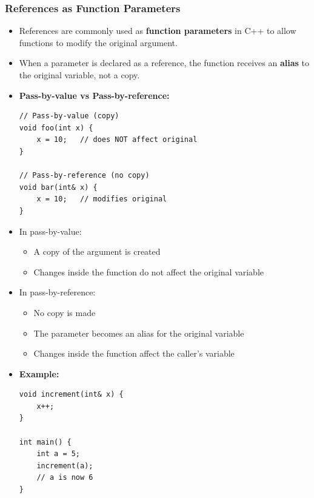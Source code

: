 \documentclass[10pt]{article}
\newcommand{\pbreak}{\vspace{30pt}}
\begin{document}
\newpage

\subsubsection{References as Function Parameters}

\begin{itemize}
    \item References are commonly used as \textbf{function parameters} in C++ to allow functions to modify the original argument.

    \item When a parameter is declared as a reference, the function receives an \textbf{alias} to the original variable, not a copy.

    \pbreak

    \item \textbf{Pass-by-value vs Pass-by-reference:}

    \begin{verbatim}
// Pass-by-value (copy)
void foo(int x) {
    x = 10;   // does NOT affect original
}

// Pass-by-reference (no copy)
void bar(int& x) {
    x = 10;   // modifies original
}
    \end{verbatim}

    \item In pass-by-value:
    \begin{itemize}
        \item A copy of the argument is created
        \item Changes inside the function do not affect the original variable
    \end{itemize}

    \item In pass-by-reference:
    \begin{itemize}
        \item No copy is made
        \item The parameter becomes an alias for the original variable
        \item Changes inside the function affect the caller's variable
    \end{itemize}

    \pbreak

    \item \textbf{Example:}
    \begin{verbatim}
void increment(int& x) {
    x++;
}

int main() {
    int a = 5;
    increment(a);
    // a is now 6
}
    \end{verbatim}


\end{itemize}
\end{document}
